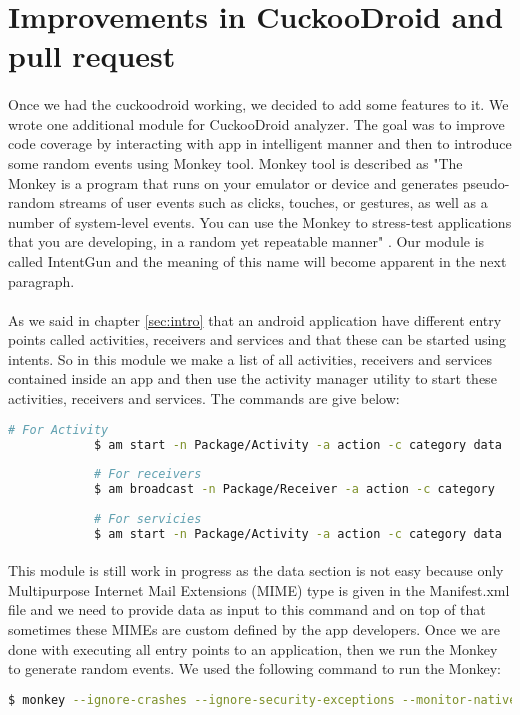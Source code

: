 \documentclass[../main.tex]{subfile}
\begin{document}
		\section{Improvements in CuckooDroid and pull request}
		\paragraph{} Once we had the cuckoodroid working, we decided to add some features to it. We wrote one additional module for CuckooDroid analyzer. The goal was to improve code coverage by interacting with app in intelligent manner and then to introduce some random events using Monkey \cite{monkey_tool} tool. Monkey tool is described as "The Monkey is a program that runs on your emulator or device and generates pseudo-random streams of user events such as clicks, touches, or gestures, as well as a number of system-level events. You can use the Monkey to stress-test applications that you are developing, in a random yet repeatable manner" \cite{monkey_tool}. Our module is called IntentGun and the meaning of this name will become apparent in the next paragraph.
		\paragraph{} As we said in chapter \ref{sec:intro} that an android application have different entry points called activities, receivers and services and that these can be started using intents. So in this module we make a list of all activities, receivers and services contained inside an app and then use the activity manager utility \cite{am} to start these activities, receivers and services. The commands are give below:
		
		\begin{lstlisting}[language=bash]
			# For Activity
			$ am start -n Package/Activity -a action -c category data
			
			# For receivers
			$ am broadcast -n Package/Receiver -a action -c category
			
			# For servicies
			$ am start -n Package/Activity -a action -c category data
		\end{lstlisting}
		\paragraph{} This module is still work in progress as the data section is not easy because only Multipurpose Internet Mail Extensions (MIME) type is given in the Manifest.xml file and we need to provide data as input to this command and on top of that sometimes these MIMEs are custom defined by the app developers. Once we are done with executing all entry points to an application, then we run the Monkey to generate random events. We used the following command to run the Monkey:
		\begin{lstlisting}[language=bash, numbers=none]
			$ monkey --ignore-crashes --ignore-security-exceptions --monitor-native-crashes -p package --throttle 500 500
		\end{lstlisting}
		
\end{document}
